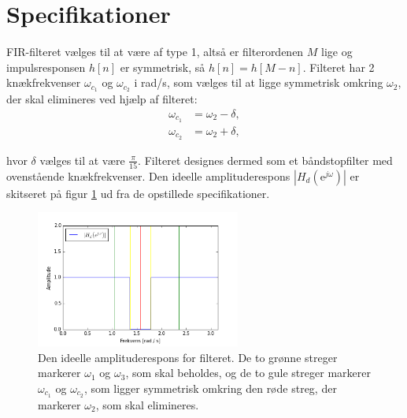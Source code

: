\section{Specifikationer} \label{ch4_specs}
FIR-filteret vælges til at være af type 1, altså er filterordenen $M$ lige og impulsresponsen $h[n]$ er symmetrisk, så $h[n] = h[M - n]$. Filteret har 2 knækfrekvenser $\omega_{c_1}$ og $\omega_{c_2}$ i rad/s, som vælges til at ligge symmetrisk omkring $\omega_2$, der skal elimineres ved hjælp af filteret:
\begin{align*}
\omega_{c_1} &= \omega_2 - \delta, \\
\omega_{c_2} &= \omega_2 + \delta,
\end{align*}

hvor $\delta$ vælges til at være $\frac{\pi}{15}$. Filteret designes dermed som et båndstopfilter med ovenstående knækfrekvenser. Den ideelle amplituderespons $|H_d(\text{e}^{j\omega})|$ er skitseret på figur \ref{fig:ideel_amp_respons} ud fra de opstillede specifikationer.
\begin{figure}[H]
    \centering
    \includegraphics[width = 0.6\textwidth]{figures/Filter/ideel_amp_respons.PNG}
    \caption{Den ideelle amplituderespons for filteret. De to grønne streger markerer $\omega_1$ og $\omega_3$, som skal beholdes, og de to gule streger markerer $\omega_{c_1}$ og $\omega_{c_2}$, som ligger symmetrisk omkring den røde streg, der markerer $\omega_2$, som skal elimineres.}
    \label{fig:ideel_amp_respons}
\end{figure}